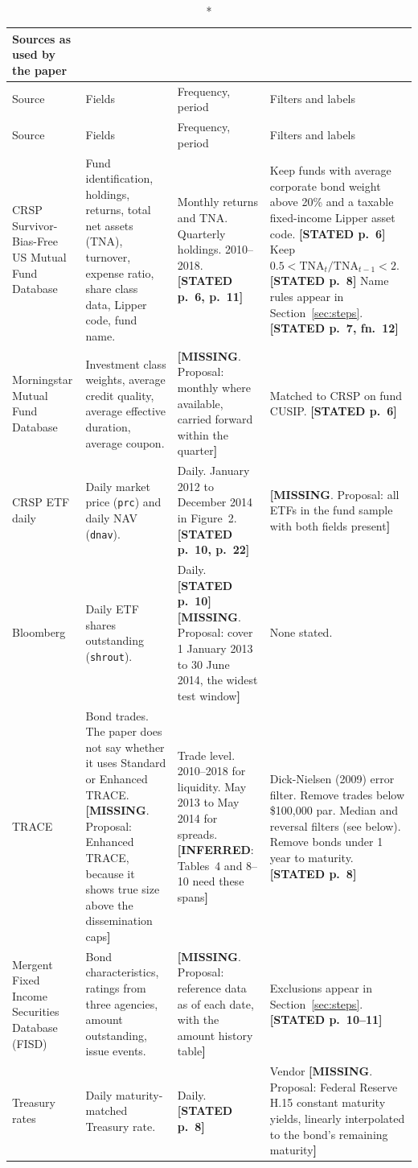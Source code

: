 \documentclass[10pt,a4paper]{article}
\newcommand{\ST}[1]{\textcolor{cst}{\textbf{[STATED #1]}}}
\newcommand{\IN}[1]{\textcolor{cin}{\textbf{[INFERRED}: #1\textbf{]}}}
\newcommand{\MI}[1]{\textcolor{cmi}{\textbf{[MISSING}. Proposal: #1\textbf{]}}}
\begin{document}
\begin{longtable}{@{}P{2.3cm}P{5cm}P{3cm}P{6.3cm}@{}}
\caption*{\textbf{Sources as used by the paper}}\\
\toprule
Source & Fields & Frequency, period & Filters and labels\\
\midrule\endfirsthead
\toprule Source & Fields & Frequency, period & Filters and labels\\ \midrule\endhead
CRSP Survivor-Bias-Free US Mutual Fund Database & Fund identification, holdings, returns, total net assets (TNA), turnover, expense ratio, share class data, Lipper code, fund name. & Monthly returns and TNA. Quarterly holdings. 2010--2018. \ST{p.~6, p.~11} & Keep funds with average corporate bond weight above 20\% and a taxable fixed-income Lipper asset code. \ST{p.~6} Keep $0.5<\text{TNA}_t/\text{TNA}_{t-1}<2$. \ST{p.~8} Name rules appear in Section~\ref{sec:steps}. \ST{p.~7, fn.~12}\\
Morningstar Mutual Fund Database & Investment class weights, average credit quality, average effective duration, average coupon. & \MI{monthly where available, carried forward within the quarter} & Matched to CRSP on fund CUSIP. \ST{p.~6}\\
CRSP ETF daily & Daily market price (\texttt{prc}) and daily NAV (\texttt{dnav}). & Daily. January 2012 to December 2014 in Figure~2. \ST{p.~10, p.~22} & \MI{all ETFs in the fund sample with both fields present}\\
Bloomberg & Daily ETF shares outstanding (\texttt{shrout}). & Daily. \ST{p.~10} \MI{cover 1 January 2013 to 30 June 2014, the widest test window} & None stated.\\
TRACE & Bond trades. The paper does not say whether it uses Standard or Enhanced TRACE. \MI{Enhanced TRACE, because it shows true size above the dissemination caps} & Trade level. 2010--2018 for liquidity. May 2013 to May 2014 for spreads. \IN{Tables~4 and 8--10 need these spans} & Dick-Nielsen (2009) error filter. Remove trades below \$100,000 par. Median and reversal filters (see below). Remove bonds under 1 year to maturity. \ST{p.~8}\\
Mergent Fixed Income Securities Database (FISD) & Bond characteristics, ratings from three agencies, amount outstanding, issue events. & \MI{reference data as of each date, with the amount history table} & Exclusions appear in Section~\ref{sec:steps}. \ST{p.~10--11}\\
Treasury rates & Daily maturity-matched Treasury rate. & Daily. \ST{p.~8} & Vendor \MI{Federal Reserve H.15 constant maturity yields, linearly interpolated to the bond's remaining maturity}\\

\end{longtable}
\end{document}
